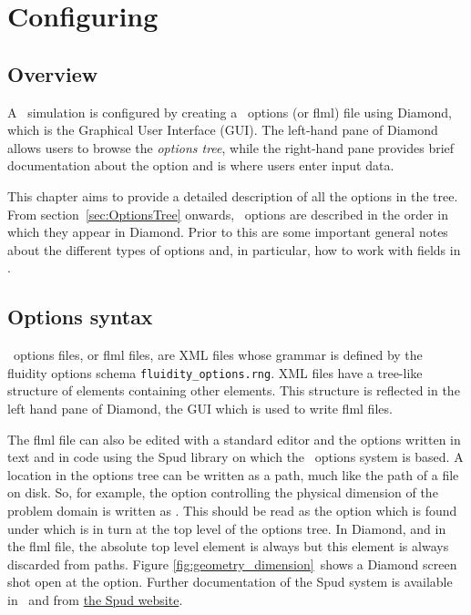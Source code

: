 \chapter{Configuring \fluidity}\label{chap:configuration}

\section{Overview}
A \fluidity\ simulation is configured by creating a \fluidity\ options (or flml) file using
Diamond, which is the Graphical User Interface (GUI). 
The left-hand pane of Diamond allows users to browse the
\emph{options tree}, while the right-hand pane provides brief documentation
about the option and is where users enter input data. 

This chapter aims to provide a detailed description of all the options in
the tree.  From section~\ref{sec:OptionsTree} onwards, \fluidity\ options are
described in the order in which they appear in Diamond.  Prior to this are
some important general notes about the different types of options and, in
particular, how to work with fields in \fluidity.

\section{Options syntax}
\fluidity\ options files, or flml files, are XML files whose grammar is defined by the
fluidity options schema \verb+fluidity_options.rng+. XML files have a
tree-like structure of elements containing other elements. This structure is
reflected in the left hand pane of Diamond, the GUI which
is used to write flml files.

The flml file can also be edited with a standard editor and the options written
in text and in code using the Spud library on which the \fluidity\ options
system is based. A location in the options tree can be written as a path,
much like the path of a file on disk. So, for example, the option
controlling the physical dimension of the problem domain is written as
. This should be read as the 
option which is found under  which is in turn at the top
level of the options tree. In Diamond, and in the flml file, the absolute
top level element is always  but this element is
always discarded from paths. Figure \ref{fig:geometry_dimension}\ shows a
Diamond screen shot open at the  option. Further
documentation of the Spud system is available in \citet{ham2009}\ and from
\href{http://amcg.ese.ic.ac.uk/spud}{the Spud website}.

